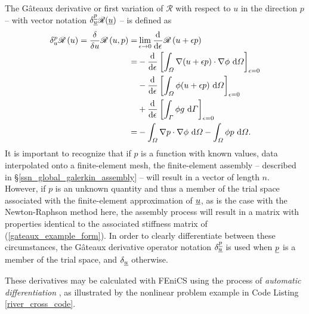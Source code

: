 The G\^{a}teaux derivative or first variation of $\mathscr{R}$ with respect to $u$ in the direction $p$ -- with vector notation $\delta_{\underline{u}}^{\underline{p}} \mathscr{R} (\underline{u})$ -- is defined as
\begin{align*}
 \delta_{u}^{p}\mathscr{R}\left( u \right) = \frac{\delta}{\delta u} \mathscr{R}\left( u,p \right) = &\lim_{\epsilon \rightarrow 0} \frac{\mathrm{d}^{} }{\mathrm{d} \epsilon^{} } \mathscr{R} \left(u + \epsilon p \right) \\
  = &- \frac{\mathrm{d}^{} }{\mathrm{d} \epsilon^{} } \left[ \int_{\varOmega} \nabla (u + \epsilon p) \cdot \nabla \phi \ \mathrm{d}\varOmega \right]_{\epsilon = 0} \\
  &- \frac{\mathrm{d}^{} }{\mathrm{d} \epsilon^{} } \left[ \int_{\varOmega} \phi (u + \epsilon p) \ \mathrm{d}\varOmega \right]_{\epsilon = 0} \\
  &+ \frac{\mathrm{d}^{} }{\mathrm{d} \epsilon^{} } \left[ \int_{\varGamma} \phi g \ \mathrm{d}\varGamma \right]_{\epsilon = 0} \\
  = &- \int_{\varOmega} \nabla p \cdot \nabla \phi \ \mathrm{d}\varOmega - \int_{\varOmega} \phi p \ \mathrm{d}\varOmega.
\end{align*}
It is important to recognize that if $p$ is a function with known values, \ie data interpolated onto a finite-element mesh, the finite-element assembly -- described in \S \ref{ssn_global_galerkin_assembly} -- will result in a vector of length $n$.  However, if $p$ is an unknown quantity and thus a member of the trial space associated with the finite-element approximation of $\underline{u}$, as is the case with the Newton-Raphson method here, the assembly process will result in a matrix with properties identical to the associated stiffness matrix of (\ref{gateaux_example_form}).  In order to clearly differentiate between these circumstances, the G\^{a}teaux derivative operator notation $\delta_{\underline{u}}^{\underline{p}}$ is used when $\underline{p}$ is a member of the trial space, and $\delta_{\underline{u}}$ otherwise.

These derivatives may be calculated with FEniCS using the process of  \emph{automatic differentiation} \citep{nocedal_2000}, as illustrated by the nonlinear problem example in Code Listing \ref{river_cross_code}.

